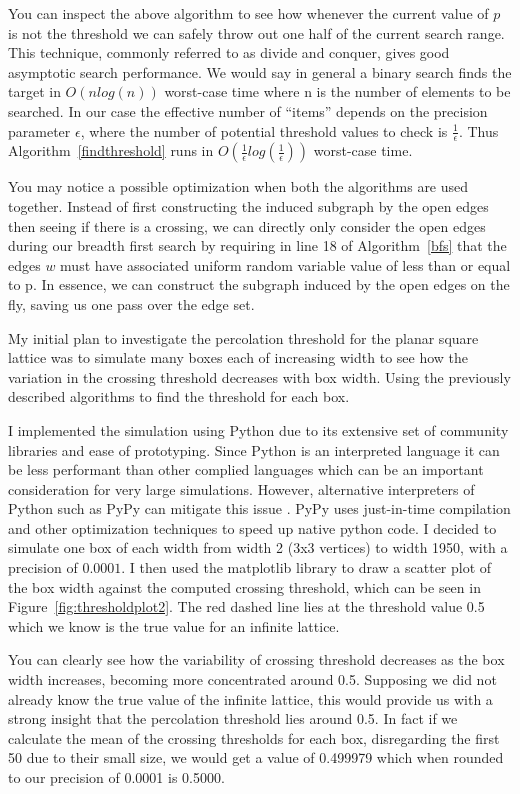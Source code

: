 \documentclass[a4paper,11pt]{article}
\theoremstyle{definition}
\begin{document}
You can inspect the above algorithm to see how whenever the current value of $p$ is not the threshold we can safely throw out one half of the current search range. This technique, commonly referred to as divide and conquer, gives good asymptotic search performance. We would say in general a binary search finds the target in $O(nlog(n))$ worst-case time where n is the number of elements to be searched. In our case the effective number of ``items'' depends on the precision parameter $\epsilon$, where the number of potential threshold values to check is $\frac{1}{\epsilon}$. Thus Algorithm~\ref*{findthreshold} runs in $O(\frac{1}{\epsilon}log(\frac{1}{\epsilon}))$ worst-case time.

You may notice a possible optimization when both the algorithms are used together. Instead of first constructing the induced subgraph by the open edges then seeing if there is a crossing, we can directly only consider the open edges during our breadth first search by requiring in line 18 of Algorithm~\ref*{bfs} that the edges $w$ must have associated uniform random variable value of less than or equal to p. In essence, we can construct the subgraph induced by the open edges on the fly, saving us one pass over the edge set. 

My initial plan to investigate the percolation threshold for the planar square lattice was to simulate many boxes each of increasing width to see how the variation in the crossing threshold decreases with box width. Using the previously described algorithms to find the threshold for each box.

I implemented the simulation using Python due to its extensive set of community libraries and ease of prototyping. Since Python is an interpreted language it can be less performant than other complied languages which can be an important consideration for very large simulations. However, alternative interpreters  of Python such as PyPy can mitigate this issue \cite{PyPy}. PyPy uses just-in-time compilation and other optimization techniques to speed up native python code.
I decided to simulate one box of each width from width 2 (3x3 vertices) to width 1950, with a precision of $0.0001$. I then used the matplotlib library to draw a scatter plot of the box width against the computed crossing threshold, which can be seen in Figure~\ref*{fig:thresholdplot2}. The red dashed line lies at the threshold value 0.5 which we know is the true value for an infinite lattice.

You can clearly see how the variability of crossing threshold decreases as the box width increases, becoming more concentrated around 0.5. Supposing we did not already know the true value of the infinite lattice, this would provide us with a strong insight that the percolation threshold lies around 0.5. In fact if we calculate the mean of the crossing thresholds for each box, disregarding the first 50 due to their small size, we would get a value of 0.499979 which when rounded to our precision of 0.0001 is 0.5000.
\end{document}

